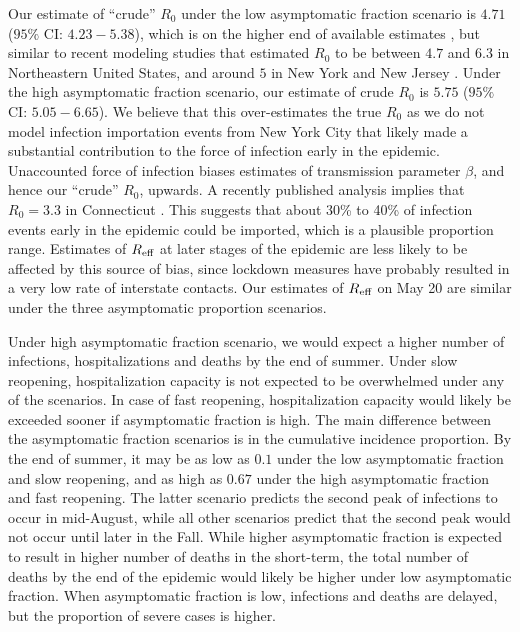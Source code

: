 \documentclass[11pt]{article}
\begin{document}
Our estimate of ``crude'' $R_0$ under the low asymptomatic fraction scenario is $4.71$ ($95\%$ CI: $4.23 - 5.38$), which is on the higher end of available estimates \citep{cdc2020scenarios, li2020early, li2020substantial, kissler2020projecting, ferguson2020impact, perez2020importance, he2020estimation, chow2020global}, but similar to recent modeling studies that estimated $R_0$ to be between $4.7$  and $6.3$ in Northeastern United States, and around $5$ in New York and New Jersey \citep{miller2020mobility, chow2020global}. Under the high asymptomatic fraction scenario, our estimate of crude $R_0$ is $5.75$ ($95\%$ CI: $5.05 - 6.65$). We believe that this over-estimates the true $R_0$ as we do not model infection importation events from New York City that likely made a substantial contribution to the force of infection early in the epidemic. 
Unaccounted force of infection biases estimates of transmission parameter $\beta$, and hence our ``crude'' $R_0$, upwards. 
A recently published analysis implies that $R_0 = 3.3$ in Connecticut \citep{kaplan2020covid}. This suggests that about 30\% to 40\% of infection events early in the epidemic could be imported, which is a plausible proportion range. 
Estimates of $R\textsubscript{eff}$ at later stages of the epidemic are less likely to be affected by this source of bias, since lockdown measures have probably resulted in a very low rate of interstate contacts. Our estimates of $R\textsubscript{eff}$ on May 20 are similar under the three asymptomatic proportion scenarios.

Under high asymptomatic fraction scenario, we would expect a higher number of infections, hospitalizations and deaths by the end of summer. 
Under slow reopening, hospitalization capacity is not expected to be overwhelmed under any of the scenarios. 
In case of fast reopening, hospitalization capacity would likely be exceeded sooner if asymptomatic fraction is high. 
The main difference between the asymptomatic fraction scenarios is in the cumulative incidence proportion. By the end of summer, it may be as low as $0.1$ under the low asymptomatic fraction and slow reopening, and as high as $0.67$ under the high asymptomatic fraction and fast reopening. The latter scenario predicts the second peak of infections to occur in mid-August, while all other scenarios predict that the second peak would not occur until later in the Fall. 
While higher asymptomatic fraction is expected to result in higher number of deaths in the short-term, the total number of deaths by the end of the epidemic would likely be higher under low asymptomatic fraction. When asymptomatic fraction is low, infections and deaths are delayed, but the proportion of severe cases is higher. 
\end{document}
